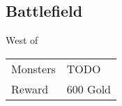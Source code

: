 \subsection{Battlefield}
\label{map:battlefield_09}

West of 

\begin{longtable}{ l p{9cm} }
	Monsters
	& TODO
\\
	Reward & 600 Gold
\end{longtable}
